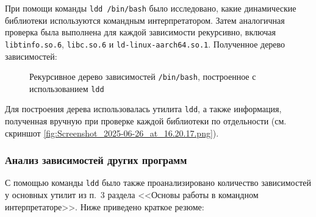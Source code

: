 При помощи команды \texttt{ldd /bin/bash} было исследовано, какие динамические библиотеки используются командным интерпретатором. Затем аналогичная проверка была выполнена для каждой зависимости рекурсивно, включая \texttt{libtinfo.so.6}, \texttt{libc.so.6} и \texttt{ld-linux-aarch64.so.1}. Полученное дерево зависимостей:

\usetikzlibrary{trees}

\begin{figure}[H]
\centering
{}
\caption{Рекурсивное дерево зависимостей \texttt{/bin/bash}, построенное с использованием \texttt{ldd}}
\label{fig:bash-ldd-tree}
\end{figure}

Для построения дерева использовалась утилита \texttt{ldd}, а также информация, полученная вручную при проверке каждой библиотеки по отдельности (см. скриншот \ref{fig:Screenshot_2025-06-26_at_16.20.17.png}).


\subsubsection{Анализ зависимостей других программ}

С помощью команды \texttt{ldd} было также проанализировано количество зависимостей у основных утилит из п.~3 раздела <<Основы работы в командном интерпретаторе>>. Ниже приведено краткое резюме:

